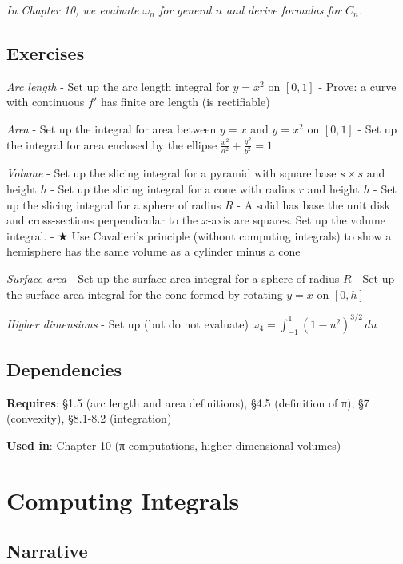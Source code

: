 \documentclass[
  10pt,
  letterpaper,
]{scrbook}
\begin{document}
\emph{In Chapter 10, we evaluate \(\omega_n\) for general \(n\) and
derive formulas for \(C_n\).}

\subsection{Exercises}\label{exercises-36}

\emph{Arc length} - Set up the arc length integral for \(y = x^2\) on
\([0, 1]\) - Prove: a curve with continuous \(f'\) has finite arc length
(is rectifiable)

\emph{Area} - Set up the integral for area between \(y = x\) and
\(y = x^2\) on \([0,1]\) - Set up the integral for area enclosed by the
ellipse \(\frac{x^2}{a^2} + \frac{y^2}{b^2} = 1\)

\emph{Volume} - Set up the slicing integral for a pyramid with square
base \(s \times s\) and height \(h\) - Set up the slicing integral for a
cone with radius \(r\) and height \(h\) - Set up the slicing integral
for a sphere of radius \(R\) - A solid has base the unit disk and
cross-sections perpendicular to the \(x\)-axis are squares. Set up the
volume integral. - ★ Use Cavalieri's principle (without computing
integrals) to show a hemisphere has the same volume as a cylinder minus
a cone

\emph{Surface area} - Set up the surface area integral for a sphere of
radius \(R\) - Set up the surface area integral for the cone formed by
rotating \(y = x\) on \([0, h]\)

\emph{Higher dimensions} - Set up (but do not evaluate)
\(\omega_4 = \int_{-1}^{1} (1-u^2)^{3/2} \, du\)

\subsection{Dependencies}\label{dependencies-36}

\textbf{Requires}: §1.5 (arc length and area definitions), §4.5
(definition of π), §7 (convexity), §8.1-8.2 (integration)

\textbf{Used in}: Chapter 10 (π computations, higher-dimensional
volumes)

\section{Computing Integrals}\label{computing-integrals}

\subsection{Narrative}\label{narrative-37}
\end{document}
